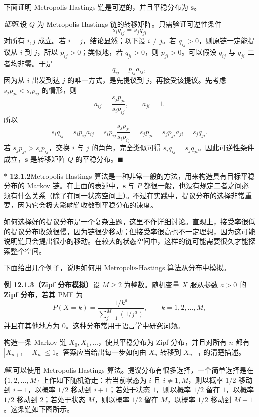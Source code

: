 \documentclass[UTF8, 12pt, fontset=fandol, oneside]{ctexart}
\newcommand{\biohazard}{\ensuremath{\ast}}
\begin{document}
下面证明 Metropolis-Hastings 链是可逆的，并且平稳分布为 $\mathbf s$。

\noindent\textit{证明.}\quad 设 $Q$ 为 Metropolis-Hastings 链的转移矩阵。只需验证可逆性条件
\[
  s_iq_{ij}=s_jq_{ji}
\]
对所有 $i,j$ 成立。若 $i=j$，结论显然；以下设 $i\ne j$。若 $q_{ij}>0$，则原链一定能提议从 $i$ 到 $j$，所以 $p_{ij}>0$；类似地，若 $q_{ji}>0$，则 $p_{ji}>0$。可以假设 $q_{ij}$ 与 $q_{ji}$ 二者均非零。于是
\[
  q_{ij}=p_{ij}a_{ij},
\]
因为从 $i$ 出发到达 $j$ 的唯一方式，是先提议到 $j$，再接受该提议。先考虑 $s_jp_{ji}<s_ip_{ij}$ 的情形，则
\[
  a_{ij}=\frac{s_jp_{ji}}{s_ip_{ij}},\qquad a_{ji}=1.
\]
所以
\[
  s_iq_{ij}
  =s_ip_{ij}a_{ij}
  =s_ip_{ij}\frac{s_jp_{ji}}{s_ip_{ij}}
  =s_jp_{ji}
  =s_jp_{ji}a_{ji}
  =s_jq_{ji}.
\]
若 $s_jp_{ji}>s_ip_{ij}$，交换 $i$ 与 $j$ 的角色，完全类似可得 $s_iq_{ij}=s_jq_{ji}$。因此可逆性条件成立，$\mathbf s$ 是转移矩阵 $Q$ 的平稳分布。$\blacksquare$

\noindent\textbf{$\biohazard$ 12.1.2}\quad Metropolis-Hastings 算法是一种非常一般的方法，用来构造具有目标平稳分布的 Markov 链。在上面的表述中，$\mathbf s$ 与 $P$ 都很一般，也没有规定二者之间必须有什么关系（除了在同一状态空间上）。不过在实践中，提议分布的选择非常重要，因为它会极大影响链收敛到平稳分布的速度。

如何选择好的提议分布是一个复杂主题，这里不作详细讨论。直观上，接受率很低的提议分布收敛很慢，因为链很少移动；但接受率很高也不一定理想，因为这可能说明链只会提出很小的移动。在较大的状态空间中，这样的链可能需要很久才能探索整个空间。

下面给出几个例子，说明如何用 Metropolis-Hastings 算法从分布中模拟。

\noindent\textbf{例 12.1.3（Zipf 分布模拟）}\quad 设 $M\ge2$ 为整数。随机变量 $X$ 服从参数 $a>0$ 的 \textbf{Zipf 分布}，若其 PMF 为
\[
  P(X=k)=\frac{1/k^a}{\sum_{j=1}^{M}(1/j^a)},
  \qquad k=1,2,\ldots,M,
\]
并且在其他地方为 $0$。这种分布常用于语言学中研究词频。

构造一条 Markov 链 $X_0,X_1,\ldots$，使其平稳分布为 Zipf 分布，并且对所有 $n$ 都有 $|X_{n+1}-X_n|\le1$。答案应当给出每一步如何由 $X_n$ 转移到 $X_{n+1}$ 的清楚描述。

\noindent\textit{解.}\quad 可以使用 Metropolis-Hastings 算法。提议分布有很多选择，一个简单选择是在 $\{1,2,\ldots,M\}$ 上作如下随机游走：若当前状态为 $i$ 且 $i\ne1,M$，则以概率 $1/2$ 移动到 $i-1$，以概率 $1/2$ 移动到 $i+1$；若处于状态 $1$，则以概率 $1/2$ 留在 $1$，以概率 $1/2$ 移动到 $2$；若处于状态 $M$，则以概率 $1/2$ 留在 $M$，以概率 $1/2$ 移动到 $M-1$。这条链如下图所示。
\end{document}
